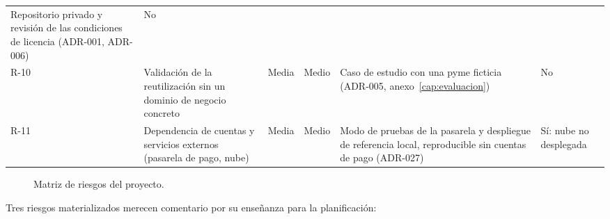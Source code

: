 \begin{table}[htbp]
\begin{tabularx}{\textwidth}{@{}l>{\raggedright\arraybackslash}p{2.8cm}cc>{\raggedright\arraybackslash}X>{\raggedright\arraybackslash}p{2.2cm}@{}}
      Repositorio privado y revisión de las condiciones de licencia (ADR-001, ADR-006) & No \\
    R-10 & Validación de la reutilización sin un dominio de negocio concreto & Media & Medio &
      Caso de estudio con una pyme ficticia (ADR-005, anexo~\ref{cap:evaluacion}) & No \\
    R-11 & Dependencia de cuentas y servicios externos (pasarela de pago, nube) & Media & Medio &
      Modo de pruebas de la pasarela y despliegue de referencia local, reproducible sin cuentas de pago (ADR-027) & Sí: nube no desplegada \\
    \bottomrule
  \end{tabularx}
\end{table}

\begin{figure}[htbp]
  \centering
  \caption{Matriz de riesgos del proyecto.}
  \label{fig:plan-matriz-riesgos}
\end{figure}

Tres riesgos materializados merecen comentario por su enseñanza para la
planificación:

